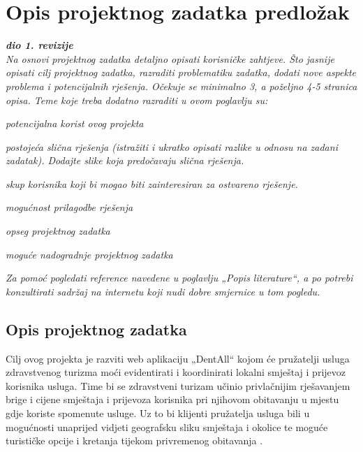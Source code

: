 \chapter{Opis projektnog zadatka predložak}
		
		\textbf{\textit{dio 1. revizije}}\\
		
		\textit{Na osnovi projektnog zadatka detaljno opisati korisničke zahtjeve. Što jasnije opisati cilj projektnog zadatka, razraditi problematiku zadatka, dodati nove aspekte problema i potencijalnih rješenja. Očekuje se minimalno 3, a poželjno 4-5 stranica opisa.	Teme koje treba dodatno razraditi u ovom poglavlju su:}
		\begin{packed_item}
			\item \textit{potencijalna korist ovog projekta}
			\item \textit{postojeća slična rješenja (istražiti i ukratko opisati razlike u odnosu na zadani zadatak). Dodajte slike koja predočavaju slična rješenja.}
			\item \textit{skup korisnika koji bi mogao biti zainteresiran za ostvareno rješenje.}
			\item \textit{mogućnost prilagodbe rješenja }
			\item \textit{opseg projektnog zadatka}
			\item \textit{moguće nadogradnje projektnog zadatka}
		\end{packed_item}
		
		\textit{Za pomoć pogledati reference navedene u poglavlju „Popis literature“, a po potrebi konzultirati sadržaj na internetu koji nudi dobre smjernice u tom pogledu.}
		\eject
		
		
		
		\section{Opis projektnog zadatka}
		Cilj ovog projekta je razviti web aplikaciju „DentAll“ kojom će pružatelji usluga zdravstvenog turizma moći evidentirati i koordinirati lokalni smještaj i prijevoz korisnika usluga. Time bi se zdravstveni turizam učinio privlačnijim rješavanjem brige i cijene smještaja i prijevoza korisnika pri njihovom obitavanju u mjestu gdje koriste spomenute usluge. Uz to bi klijenti pružatelja usluga bili u mogućnosti unaprijed vidjeti geografsku sliku smještaja i okolice te moguće turističke opcije i kretanja tijekom privremenog obitavanja .
		

